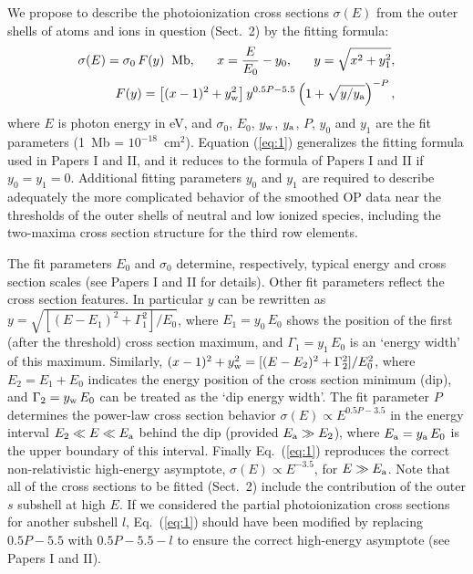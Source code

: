 We propose to describe the photoionization cross sections $\sigma(E)$ from the 
outer shells of atoms and ions in question (Sect.~2) by the fitting formula:
\begin{eqnarray}
    \sigma(E)=\sigma_0 \, F(y) \;\; {\rm Mb}, 
 \;\;\;\;\;\; 
     x = {E \over E_0} -y_0, 
 \;\;\;\;\;\; 
     y = \sqrt{x^2+ y_1^2}, 
\nonumber\\
     F(y) = \left[(x-1)^2+y_{\rm w}^2 \right]y^{0.5P-5.5}
          \left(1+ \sqrt{y/y_{\rm a}} \right )^{-P},
    \label{eq:1}
\end{eqnarray}
where $E$ is photon energy in eV, and $\sigma_0$, $E_0$, $y_{\rm w}$,
$y_{\rm a}$, $P$, $y_0$ and $y_1$ are the fit parameters
(1~Mb = $10^{-18}$~cm$^2$). Equation (\ref{eq:1})
generalizes the fitting formula used in Papers I and II, and it reduces to the 
formula of Papers I and II if $y_0=y_1=0$. Additional fitting parameters $y_0$ 
and $y_1$ are required to describe adequately the more complicated
behavior of the smoothed OP data near the thresholds 
of the outer shells of neutral and low ionized species, including the 
two-maxima cross section structure for the third row elements. 

The fit parameters $E_0$ and $\sigma_0$ determine, respectively, typical energy
and cross section scales (see Papers I and II for details). Other fit 
parameters reflect the cross section features. In particular $y$ can be 
rewritten as $y= \sqrt{[(E-E_1)^2 + \Gamma_1^2]/E_0}$, where $E_1=y_0 \, E_0$ 
shows the position of the first (after the threshold) cross section maximum, 
and $\Gamma_1 = y_1 \, E_0$ is an `energy width' of this maximum. Similarly,
$(x-1)^2+y_{\rm w}^2 = [(E-E_2)^2 + \Gamma_2^2]/E_0^2$, where $E_2=E_1+E_0$ 
indicates the energy position of the cross section minimum (dip), and 
$\Gamma_2= y_{\rm w} \, E_0$ can be treated as the `dip energy width'. The fit 
parameter $P$ determines the power-law cross section behavior
$\sigma(E) \propto E^{0.5P-3.5}$ in the energy interval
$E_2 \ll E \ll E_{\rm a}$ behind the dip (provided $E_{\rm a} \gg E_2$),
where $E_{\rm a} = y_{\rm a} \, E_0$ is the upper boundary of this interval.
Finally Eq.~(\ref{eq:1}) reproduces the correct non-relativistic high-energy 
asymptote, $\sigma(E) \propto E^{-3.5}$, for $E \gg E_{\rm a}$. Note that all 
of the cross sections to be fitted (Sect.~2) include the contribution of the 
outer $s$ subshell at high $E$. If we considered the partial photoionization 
cross sections for another subshell $l$, Eq.~(\ref{eq:1}) should have been 
modified by replacing $0.5P-5.5$ with $0.5P-5.5-l$ to ensure the correct 
high-energy asymptote (see Papers I and II).

